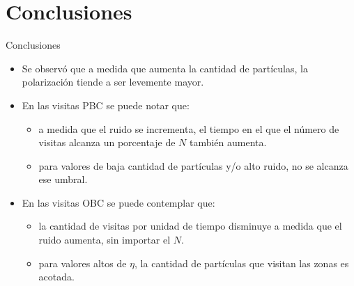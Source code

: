 \documentclass{beamer}
\begin{document}
    \section{Conclusiones}

        \begin{frame}{Conclusiones}
            \begin{itemize}
                \item Se observó que a medida que aumenta la cantidad de partículas, la polarización tiende a ser
                levemente mayor.
                \item En las visitas PBC se puede notar que:
                \begin{itemize}
                    \item a medida que el ruido se incrementa, el tiempo en el que el número de visitas alcanza un
                    porcentaje de $N$ también aumenta.
                    \item para valores de baja cantidad de partículas y/o alto ruido, no se alcanza ese umbral.
                \end{itemize}
                \item En las visitas OBC se puede contemplar que:
                \begin{itemize}
                    \item la cantidad de visitas por unidad de tiempo disminuye a medida que el ruido aumenta, sin importar el $N$.
                    \item para valores altos de $\eta$, la cantidad de partículas que visitan las zonas es acotada.
                \end{itemize}
            \end{itemize}
        \end{frame}
\end{document}
